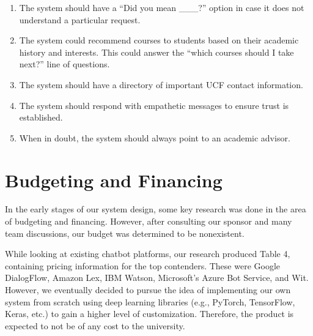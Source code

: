 \documentclass[titlepage, 12pt]{article}
\begin{document}
\begin{enumerate}
    \item The system should have a “Did you mean \_\_\_?” option in case it does not understand a particular request.
    \item The system could recommend courses to students based on their academic history and interests. This could answer the “which courses should I take next?” line of questions.
    \item The system should have a directory of important UCF contact information.
    \item The system should respond with empathetic messages to ensure trust is established.
    \item When in doubt, the system should always point to an academic advisor.
\end{enumerate}











\pagebreak
\section{Budgeting and Financing}

In the early stages of our system design, some key research was done in the area of budgeting and financing. However, after consulting our sponsor and many team discussions, our budget was determined to be nonexistent.

While looking at existing chatbot platforms, our research produced Table 4, containing pricing information for the top contenders. These were Google DialogFlow, Amazon Lex, IBM Watson, Microsoft’s Azure Bot Service, and Wit. However, we eventually decided to pursue the idea of implementing our own system from scratch using deep learning libraries (e.g., PyTorch, TensorFlow, Keras, etc.) to gain a higher level of customization. Therefore, the product is expected to not be of any cost to the university.
\end{document}
